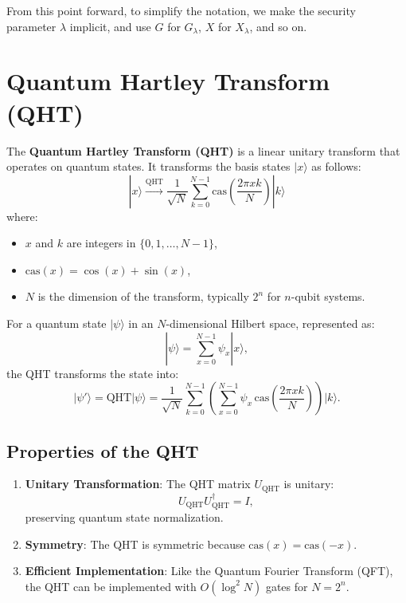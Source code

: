 \documentclass[11pt]{article}
\theoremstyle{definition}
\begin{document}
From this point forward, to simplify the notation, we make the security parameter $\lambda$ implicit, and use $G$ for $G_\lambda$, $X$ for $X_\lambda$, and so on. 




\section*{Quantum Hartley Transform (QHT)}

The \textbf{Quantum Hartley Transform (QHT)} is a linear unitary transform that operates on quantum states. It transforms the basis states \( |x\rangle \) as follows:
\[
|x\rangle \xrightarrow{\text{QHT}} \frac{1}{\sqrt{N}} \sum_{k=0}^{N-1} \text{cas}\left(\frac{2\pi x k}{N}\right) |k\rangle
\]
where:
\begin{itemize}
    \item \( x \) and \( k \) are integers in \( \{0, 1, \dots, N-1\} \),
    \item \( \text{cas}(x) = \cos(x) + \sin(x) \),
    \item \( N \) is the dimension of the transform, typically \( 2^n \) for \( n \)-qubit systems.
\end{itemize}

For a quantum state \( |\psi\rangle \) in an \( N \)-dimensional Hilbert space, represented as:
\[
|\psi\rangle = \sum_{x=0}^{N-1} \psi_x |x\rangle,
\]
the QHT transforms the state into:
\[
|\psi'\rangle = \text{QHT} |\psi\rangle = \frac{1}{\sqrt{N}} \sum_{k=0}^{N-1} \left( \sum_{x=0}^{N-1} \psi_x \, \text{cas}\left(\frac{2\pi x k}{N}\right) \right) |k\rangle.
\]


\subsection*{Properties of the QHT}
\begin{enumerate}
    \item \textbf{Unitary Transformation}: The QHT matrix \( U_{\text{QHT}} \) is unitary:
    \[
    U_{\text{QHT}} U_{\text{QHT}}^\dagger = I,
    \]
    preserving quantum state normalization.
    \item \textbf{Symmetry}: The QHT is symmetric because \( \text{cas}(x) = \text{cas}(-x) \).
    \item \textbf{Efficient Implementation}: Like the Quantum Fourier Transform (QFT), the QHT can be implemented with \( O(\log^2 N) \) gates for \( N = 2^n \).
\end{enumerate}
\end{document}

